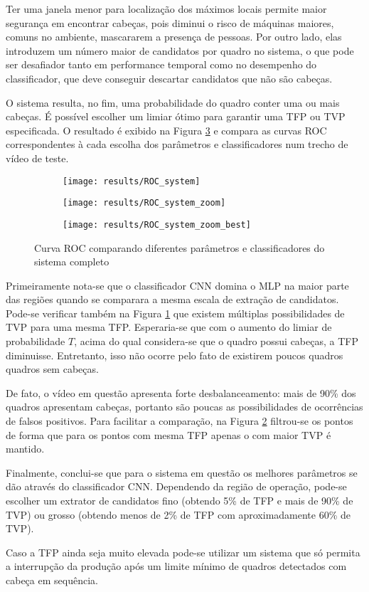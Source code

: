 Ter uma janela menor para localização dos máximos locais permite maior segurança em encontrar cabeças, pois diminui o risco de máquinas maiores, comuns no ambiente, mascararem a presença de pessoas. Por outro lado, elas introduzem um número maior de candidatos por quadro no sistema, o que pode ser desafiador tanto em performance temporal como no desempenho do classificador, que deve conseguir descartar candidatos que não são cabeças.

O sistema resulta, no fim, uma probabilidade do quadro conter uma ou mais cabeças. É possível escolher um limiar ótimo para garantir uma TFP ou TVP especificada. O resultado é exibido na Figura \ref{fig:ROC-system} e compara as curvas ROC correspondentes à cada escolha dos parâmetros e classificadores num trecho de vídeo de teste.

\begin{figure}
\centering
\begin{subfigure}{0.5\textwidth}
  \centering
  \texttt{[image: results/ROC\_system]}
  \caption{}
\end{subfigure}%
\begin{subfigure}{.5\textwidth}
  \centering
  \texttt{[image: results/ROC\_system\_zoom]}
  \caption{}
  \label{fig:ROC-system:zoom}
\end{subfigure}
\begin{subfigure}{.5\textwidth}
  \centering
  \texttt{[image: results/ROC\_system\_zoom\_best]}
  \caption{}
  \label{fig:ROC-system:zoom_best}
\end{subfigure}
\caption{Curva ROC comparando diferentes parâmetros e classificadores do sistema completo}
\label{fig:ROC-system}
\end{figure}

Primeiramente nota-se que o classificador CNN domina o MLP na maior parte das regiões quando se comparara a mesma escala de extração de candidatos. Pode-se verificar também na Figura \ref{fig:ROC-system:zoom} que existem múltiplas possibilidades de TVP para uma mesma TFP. 
Esperaria-se que com o aumento do limiar de probabilidade $T$, acima do qual considera-se que o quadro possui cabeças, a TFP diminuisse. Entretanto, isso não ocorre pelo fato de existirem poucos quadros quadros sem cabeças.

De fato, o vídeo em questão apresenta forte desbalanceamento: mais de 90\% dos quadros apresentam cabeças, portanto são poucas as possibilidades de ocorrências de falsos positivos. Para facilitar a comparação, na Figura \ref{fig:ROC-system:zoom_best} filtrou-se os pontos de forma que para os pontos com mesma TFP apenas o com maior TVP é mantido.

Finalmente, conclui-se que para o sistema em questão os melhores parâmetros se dão através do classificador CNN. Dependendo da região de operação, pode-se escolher um extrator de candidatos fino (obtendo 5\% de TFP e mais de 90\% de TVP) ou grosso (obtendo menos de 2\% de TFP com aproximadamente 60\% de TVP). 

Caso a TFP ainda seja muito elevada pode-se utilizar um sistema que só permita a interrupção da produção após um limite mínimo de quadros detectados com cabeça em sequência.


